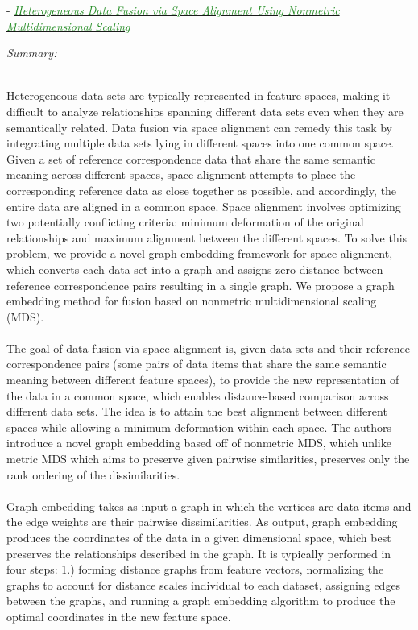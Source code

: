 \documentclass[]{article}
\newcommand{\paperentry}[4]{
            \hangindent=1cm
            \textcolor{red}{\cite{#1}} - \href{run:../References/#3}{\textcolor{ForestGreen}{\textit{#2}}}
            
            \noindent            
            \begin{minipage}[t]{0.1\linewidth}\hfill\end{minipage}
            \begin{minipage}[t]{0.8\linewidth}\textcolor{NavyBlue}{{\textit{Summary:}}}#4\end{minipage}
            \vspace{.25cm}
          }
\begin{document}
		\paperentry{Choo2012HeterogeneousDataFusionGraphs}
		{Heterogeneous Data Fusion via Space Alignment Using Nonmetric Multidimensional Scaling}
		{Manifold_Representation_Learning/Alignment/Choo2012HeterogeneousDataFusionGraphs.pdf}
		{}\\
		Heterogeneous data sets are typically represented in feature spaces, making it difficult to analyze relationships spanning different data sets even when they are semantically related. Data fusion via space alignment can remedy this task by integrating multiple data sets lying in different spaces into one common space. Given a set of reference correspondence data that share the same semantic meaning across different spaces, space alignment attempts to place the corresponding reference data as close together as possible, and accordingly, the entire data are aligned in a common space. Space alignment involves optimizing two	potentially conflicting criteria: minimum deformation of the
		original relationships and maximum alignment between the different spaces. To solve this problem, we provide a novel	graph embedding framework for space alignment, which converts each data set into a graph and assigns zero distance between reference correspondence pairs resulting in a single graph. We propose a graph embedding method for fusion based on nonmetric multidimensional scaling (MDS). 
		\\ \\
		The goal of data fusion via space alignment is, given data sets and their reference correspondence pairs (some pairs of data items that share the same semantic meaning between different feature spaces), to provide the new representation of the data in a common space, which enables distance-based comparison across different data sets.   The idea is to attain the best alignment between different spaces while allowing a minimum deformation within each space.  The authors introduce a novel graph embedding based off of nonmetric MDS, which unlike metric MDS which aims to preserve given pairwise similarities, preserves only the rank ordering of the dissimilarities.
		\\ \\
		Graph embedding takes as input a graph in which the vertices are data items and the edge weights are their pairwise dissimilarities.  As output, graph embedding produces the coordinates of the data in a given dimensional space, which best preserves the relationships described in the graph.  It is typically performed in four steps: 1.) forming distance graphs from feature vectors, normalizing the graphs to account for distance scales individual to each dataset, assigning edges between the graphs, and running a graph embedding algorithm to produce the optimal coordinates in the new feature space.
\end{document}
